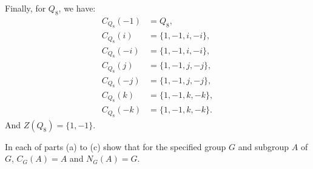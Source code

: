 \begin{solution}
  Finally, for $Q_8$, we have:
  \begin{align*}
    C_{Q_8}(-1) &= Q_8, \\
    C_{Q_8}(i) &= \{1, -1, i, -i\}, \\
    C_{Q_8}(-i) &= \{1, -1, i, -i\}, \\
    C_{Q_8}(j) &= \{1, -1, j, -j\}, \\
    C_{Q_8}(-j) &= \{1, -1, j, -j\}, \\
    C_{Q_8}(k) &= \{1, -1, k, -k\}, \\
    C_{Q_8}(-k) &= \{1, -1, k, -k\}.
  \end{align*}
  And $Z(Q_8) = \{1, -1\}$.
\end{solution}

 In each of parts (a) to (c) show that for the specified
group $G$ and subgroup $A$ of $G$, $C_G(A) = A$ and $N_G(A) = G$.
